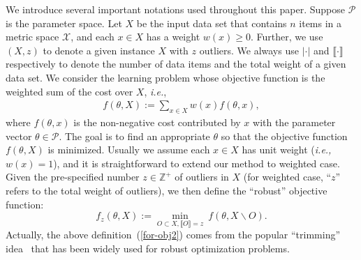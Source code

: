 \documentclass{article}
\begin{document}
We introduce several important notations used throughout this paper. 
Suppose $\mathcal{P}$ is the parameter space. Let $X$ be the input data set that contains $n$ items in a metric space $\mathcal{X}$, and each $x\in X$ has a weight $w(x)\geq 0$. Further, we use $ (X,z) $ to  denote a given instance $X$ with $z$ outliers. 
We always use $|\cdot|$ and $\llbracket \cdot \rrbracket$ respectively to denote the number of data items and the total weight of a given data set. We consider the learning problem whose objective function is the weighted sum of the cost over $X$, {\em i.e.}, 
\begin{eqnarray}
 f(\theta,X):=\sum_{x\in X} w(x) f(\theta,x),\label{for-obj} 
\end{eqnarray}
where $f(\theta,x)$ is the non-negative cost contributed by $x$ with the parameter vector $\theta\in \mathcal{P}$. The goal is to find an appropriate $\theta$ so that the objective function $f(\theta,X)$ is minimized. Usually we assume each $x\in X $ has unit weight ({\em i.e.,}  $ w(x)=1 $), and it is straightforward  to extend our method to weighted case. Given the pre-specified number $ z\in\mathbb{Z}^+ $ of outliers in $ X $ (for weighted case, ``$z$'' refers to the total weight of outliers), we then define the ``robust'' objective function: 
\begin{equation}
    f_{z}(\theta,X) := \min_{O\subset X, \llbracket O \rrbracket = z}\ {f}(\theta,X\backslash O).\label{for-obj2} 
\end{equation}
Actually, the above definition~(\ref{for-obj2}) comes from the popular ``trimming'' idea~\cite{books/wi/RousseeuwL87} that has been widely used for robust optimization problems. 

\end{document}
